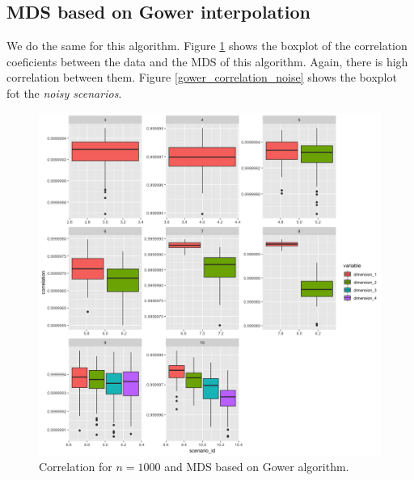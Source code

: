 \documentclass[11pt]{report}
\begin{document}
\subsection{MDS based on Gower interpolation}
We do the same for this algorithm. Figure \ref{gower_correlation_1000} shows 
the boxplot of the correlation coeficients between the data and the MDS 
of this algorithm. Again, there is high correlation between them. 
Figure \ref{gower_correlation_noise} shows the boxplot fot the 
\textit{noisy scenarios}.

\begin{figure}[ht]
\centering
    \includegraphics{./images/gower_correlation_1000.png}
    \caption{Correlation for $n = 1000$ and MDS based on Gower algorithm.}
    \label{gower_correlation_1000}
\end{figure}
\end{document}
